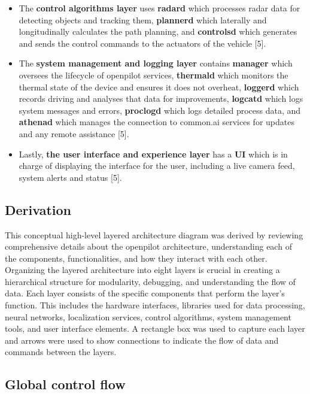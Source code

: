 \documentclass[12pt]{article}
\begin{document}
\begin{itemize}
        \item The \textbf{control algorithms layer} uses \textbf{radard} which processes radar data for detecting objects and tracking them, \textbf{plannerd} which laterally and longitudinally calculates the path planning, and \textbf{controlsd} which generates and sends the control commands to the actuators of the vehicle [5].

        \item The \textbf{system management and logging layer} contains \textbf{manager} which oversees the lifecycle of openpilot services, \textbf{thermald} which monitors the thermal state of the device and ensures it does not overheat, \textbf{loggerd} which records driving and analyses that data for improvements, \textbf{logcatd} which logs system messages and errors, \textbf{proclogd} which logs detailed process data, and \textbf{athenad} which manages the connection to common.ai services for updates and any remote assistance [5].
        
        \item Lastly, \textbf{the user interface and experience layer} has a \textbf{UI} which is in charge of displaying the interface for the user, including a live camera feed, system alerts and status [5].  

    
        
    \end{itemize}

\subsection{Derivation}
  
    This conceptual high-level layered architecture diagram was derived by reviewing comprehensive details about the openpilot architecture, understanding each of the components, functionalities, and how they interact with each other. Organizing the layered architecture into eight layers is crucial in creating a hierarchical structure for modularity, debugging, and understanding the flow of data. Each layer consists of the specific components that perform the layer’s function. This includes the hardware interfaces, libraries used for data processing, neural networks, localization services, control algorithms, system management tools, and user interface elements. A rectangle box was used to capture each layer and arrows were used to show connections to indicate the flow of data and commands between the layers. 

\subsection{Global control flow}
\end{document}
